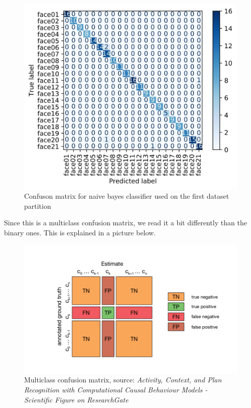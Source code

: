 \documentclass[12pt,a4paper]{article}
\begin{document}
    \begin{figure}[H]
		\centering
		\includegraphics[width=1\linewidth]{images/naive_bayes_confusion_matrix.jpg}
		\caption{Confuson matrix for naive bayes classifier used on the first dataset partition}
    \end{figure}

    Since this is a multiclass confusion matrix, we read it a bit differently than the binary ones. This is explained in a picture below.

    \begin{figure}[H]
      \centering
      \includegraphics[width=1\linewidth]{images/Confusion_matrix_explanation.png}
      \caption{Multiclass confusion matrix, source: \small \textit{Activity, Context, and Plan Recognition with Computational Causal Behaviour Models - Scientific Figure on ResearchGate}}
    \end{figure}
\end{document}
